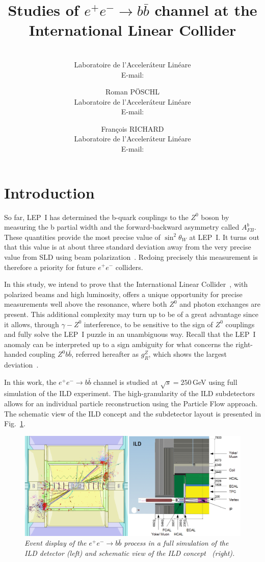 \documentclass{PoS}
\title{Studies of $ e^+e^-\to b\bar{b}$ channel at the International Linear Collider}
\author{\speaker{Sviatoslav BILOKIN}\\%
        Laboratoire de l'Acceler\'ateur Lin\'eare\\
        E-mail: \email{bilokin@lal.in2p3.fr}}
\author{Roman P\"OSCHL\\
        Laboratoire de l'Acceler\'ateur Lin\'eare\\
        E-mail: \email{poeschl@lal.in2p3.fr}}
\author{Fran\c cois RICHARD\\
	Laboratoire de l'Acceler\'ateur Lin\'eare\\
	E-mail: \email{richard@lal.in2p3.fr}}
\newcommand{\afb}{$A_{FB}^b$}
\begin{document}
\section{Introduction}
So far, LEP~I has determined the b-quark couplings to the $Z^0$ boson by measuring the b partial width and the forward-backward asymmetry called \afb. These quantities provide the most precise value of $\sin^2\theta_W$ at LEP~I. It turns out that this value is at about three standard deviation away from the very precise value from SLD using beam polarization~\cite{bib:AfbSMFit}. Redoing precisely this measurement is therefore a priority for future $e^+e^-$ colliders. 

In this study, we intend to prove that the International Linear Collider~\cite{bib:ILC}, with {polarized beams and high luminosity}, offers a unique opportunity for precise measurements well above the resonance, where both $Z^0$ and photon exchanges are present. 
This additional complexity may turn up to be of a great advantage since it allows, through $\gamma - Z^0$ interference, to be sensitive to the sign of $Z^0$ couplings and fully solve the LEP~I puzzle in an unambiguous way. 
Recall that the LEP~I anomaly can be interpreted up to a sign ambiguity for what concerns the right-handed coupling $Z^0 b\bar{b}$, referred hereafter as $g_R^Z$, which shows the largest deviation~\cite{bib:RSTOP}.


In this work, the $e^+ e^-\to b\bar{b}$ channel is studied at $\sqrt{s}=250$\,GeV using full simulation of the ILD experiment.
The high-granularity of the ILD subdetectors allows for an individual particle reconstruction using the Particle Flow approach.
The schematic view of the ILD concept and the subdetector layout is presented in Fig.~\ref{fig:ILDScheme}.

\begin{figure}[h]
	{\centering
		\includegraphics[width=0.9\linewidth]{../poster/figures/ild3.png}
		\caption{\sl Event display of the $e^+ e^-\to b\bar{b}$ process in a full simulation of the ILD detector (left) and schematic view of the ILD concept~\cite{bib:ILC} (right). }
		\label{fig:ILDScheme}
	}
\end{figure}
\end{document}
